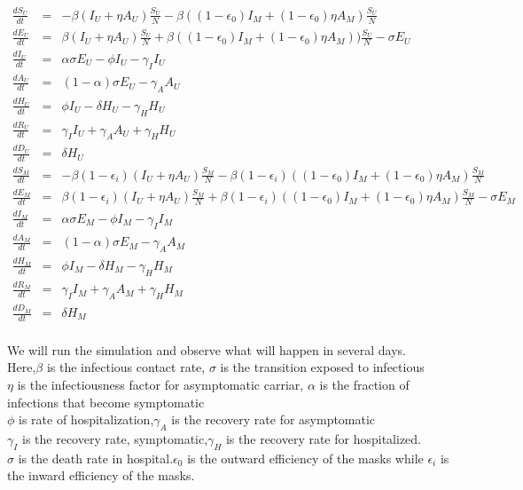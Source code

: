 \documentclass{article}
\begin{document}
\begin{minipage}{0.35\textwidth}
\tiny
\begin{eqnarray}
  \frac{dS_{U}}{dt} &=& -\beta(I_{U}+\eta A_{U})\frac{S_{U}}{N}-\beta((1-\epsilon_{0})I_{M}+(1-\epsilon_{0})\eta A_{M})\frac{S_{U}}{N}\nonumber\\
  \frac{dE_{U}}{dt} &=& \beta(I_{U}+\eta{A}_{U})\frac{S_{U}}{N}+\beta((1-\epsilon_{0})I_{M}+(1-\epsilon_{0})\eta A_{M}))\frac{S_{U}}{N}-\sigma E_{U}\nonumber\\
  \frac{dI_{U}}{dt} &=& \alpha\sigma E_{U}-\phi I_{U}-\gamma_{I}I_{U}\nonumber\\
  \frac{dA_{U}}{dt} &=& (1-\alpha)\sigma E_{U}-\gamma_{A}A_{U}\nonumber\\
  \frac{dH_{U}}{dt} &=& \phi I_{U}-\delta H_{U}-\gamma_{H}H_{U}\nonumber\\
  \frac{dR_{U}}{dt} &=& \gamma_{I}I_{U}+\gamma_{A}A_{U}+\gamma_{H}H_{U}\nonumber\\
  \frac{dD_{U}}{dt} &=& \delta H_{U}\nonumber\\
  \frac{dS_{M}}{dt} &=& -\beta(1-\epsilon_{i})(I_{U}+\eta A_{U})\frac{S_{M}}{N}-\beta(1-\epsilon_{i})((1-\epsilon_{0})I_{M}+(1-\epsilon_{0})\eta A_{M})\frac{S_{M}}{N}\nonumber\\
  \frac{dE_{M}}{dt} &=& \beta(1-\epsilon_{i})(I_{U}+\eta A_{U})\frac{S_{M}}{N}+\beta(1-\epsilon_{i})((1-\epsilon_{0})I_{M}+(1-\epsilon_{0})\eta A_{M})\frac{S_{M}}{N}-\sigma E_{M} \nonumber\\
  \frac{dI_{M}}{dt} &=& \alpha\sigma E_{M} - \phi I_{M}-\gamma_{I} I_{M}\nonumber\\
  \frac{dA_{M}}{dt} &=& (1-\alpha)\sigma E_{M}-\gamma_{A}A_{M}\nonumber\\
  \frac{dH_{M}}{dt} &=& \phi I_{M}-\delta H_{M}-\gamma_{H}H_{M}\nonumber\\
  \frac{dR_{M}}{dt} &=& \gamma_{I}I_{M} +\gamma_{A}A_{M}+\gamma_{H}H_{M}\nonumber\\
  \frac{dD_{M}}{dt} &=& \delta H_{M}\nonumber\\
\end{eqnarray}
\end{minipage}

We will run the simulation and observe what will happen in several days. \\Here,$\beta$ is the infectious contact rate, $\sigma$ is the transition exposed to infectious\\$\eta$ is the infectiousness factor for asymptomatic carriar, $\alpha$ is the fraction of infections that become symptomatic\\
$\phi$ is rate of hospitalization,$\gamma_{A}$ is the recovery rate for asymptomatic
\\$\gamma_{I}$ is the recovery rate, symptomatic,$\gamma_{H}$ is the recovery rate for hospitalized.\\$\sigma$ is the death rate in hospital.$\epsilon_{0}$ is the outward efficiency of the masks while $\epsilon_{i}$ is the inward efficiency of the masks.\\
\end{document}
